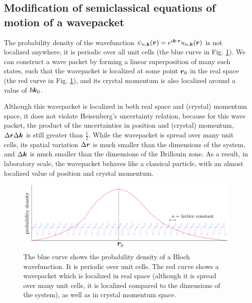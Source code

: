 \documentclass{report}
\renewcommand\vec[1]{\ensuremath\boldsymbol{#1}} %
\begin{document}
\subsection{Modification of semiclassical equations of motion of a wavepacket}\label{sec:Modification-semiclassical}
The probability density of the wavefunction $\psi_{n, \vec{k}} (\vec{r}) = e^{i \vec{k}\cdot \vec{r}} u_{n,\vec{k}} (\vec{r})$ is not localized anywhere, it is periodic over all unit cells (the blue curve in Fig. \ref{fig:wavepacket-and-bloch-wave}). We can construct a wave packet by forming a linear superposition of many such states, such that the wavepacket is localized at some point $\vec{r}_0$ in the real space (the red curve in Fig. \ref{fig:wavepacket-and-bloch-wave}), and its crystal momentum is also localized around a value of $\hbar \vec{k}_0$.

Although this wavepacket is localized in both real space and (crystal) momentum space, it does not violate Heisenberg's uncertainty relation, because for this wave packet, the product of the uncertainties in position and (crystal) momentum, $\Delta \vec{r} \Delta \vec{k}$ is still greater than $\frac{1}{2}$. While the wavepacket is spread over many unit cells, its spatial variation $\Delta \vec{r}$ is much smaller than the dimensions of the system, and $\Delta \vec{k}$ is much smaller than the dimensions of the Brillouin zone. As a result, in laboratory scale, the wavepacket behaves like a classical particle, with an almost localized value of position and crystal momentum.

\begin{figure}[h!]
	\centering
	\includegraphics[width=0.7\linewidth]{wavepacket-and-Bloch-wave}
	\caption{The blue curve shows the probability density of a Bloch wavefunction. It is periodic over unit cells. The red curve shows a wavepacket which is localized in real space (although it is spread over many unit cells, it is localized compared to the dimensions of the system), as well as in crystal momentum space.}
	\label{fig:wavepacket-and-bloch-wave}
\end{figure}
\end{document}
